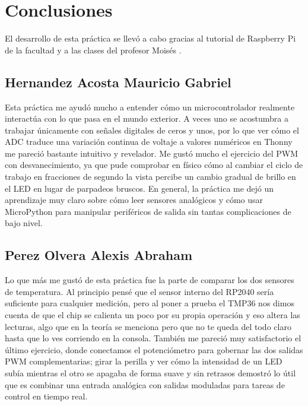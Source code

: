 \section{Conclusiones}

El desarrollo de esta práctica se llevó a cabo gracias al tutorial de Raspberry Pi de la facultad \cite{FI_UNAM_Raspberry_2026} y a las clases del profesor Moisés \cite{Melendez_Reyes_2026}.

\subsection{Hernandez Acosta Mauricio Gabriel}
Esta práctica me ayudó mucho a entender cómo un microcontrolador realmente interactúa con lo que pasa en el mundo exterior. A veces uno se acostumbra a trabajar únicamente con señales digitales de ceros y unos, por lo que ver cómo el ADC traduce una variación continua de voltaje a valores numéricos en Thonny me pareció bastante intuitivo y revelador. Me gustó mucho el ejercicio del PWM con desvanecimiento, ya que pude comprobar en físico cómo al cambiar el ciclo de trabajo en fracciones de segundo la vista percibe un cambio gradual de brillo en el LED en lugar de parpadeos bruscos. En general, la práctica me dejó un aprendizaje muy claro sobre cómo leer sensores analógicos y cómo usar MicroPython para manipular periféricos de salida sin tantas complicaciones de bajo nivel.

\subsection{Perez Olvera Alexis Abraham}
Lo que más me gustó de esta práctica fue la parte de comparar los dos sensores de temperatura. Al principio pensé que el sensor interno del RP2040 sería suficiente para cualquier medición, pero al poner a prueba el TMP36 nos dimos cuenta de que el chip se calienta un poco por su propia operación y eso altera las lecturas, algo que en la teoría se menciona pero que no te queda del todo claro hasta que lo ves corriendo en la consola. También me pareció muy satisfactorio el último ejercicio, donde conectamos el potenciómetro para gobernar las dos salidas PWM complementarias; girar la perilla y ver cómo la intensidad de un LED subía mientras el otro se apagaba de forma suave y sin retrasos demostró lo útil que es combinar una entrada analógica con salidas moduladas para tareas de control en tiempo real.

